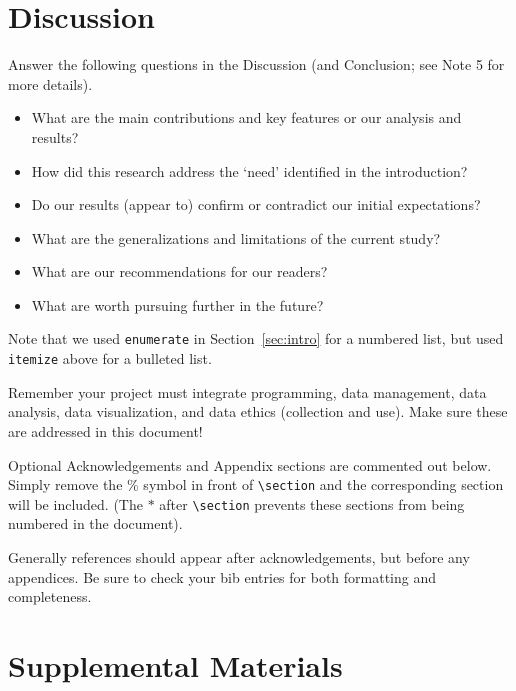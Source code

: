 \documentclass[12pt]{article}
\begin{document}
\section{Discussion}
\label{sec:disc}

Answer the following questions in the Discussion (and Conclusion; see Note 5 for 
more details).

\begin{itemize}
\item What are the main contributions and key features or our analysis and results?
\item How did this research address the `need' identified in the introduction?
\item Do our results (appear to) confirm or contradict our initial expectations?
\item What are the generalizations and limitations of the current study?
\item What are our recommendations for our readers?
\item What are worth pursuing further in the future?
\end{itemize}


Note that we used \verb|enumerate| in Section~\ref{sec:intro} for a numbered 
list, but used \verb|itemize| above for a bulleted list.


Remember your project must integrate programming, data management,
data analysis, data visualization, and data ethics (collection and use).  
Make sure these are addressed in this document!


Optional Acknowledgements and Appendix sections are 
commented out below. Simply remove the $\%$ symbol in front of \verb|\section| 
and the corresponding section will be included.  
(The $*$ after \verb|\section| prevents these sections from being numbered in 
the document). 

Generally references should appear after acknowledgements, but before any
appendices. Be sure to check your bib entries for both formatting and 
completeness. 


\section*{Supplemental Materials}
\end{document}
